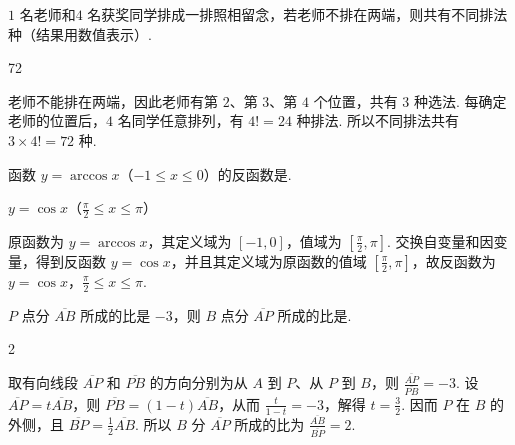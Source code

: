 \documentclass[UTF8,a4paper,oneside,11pt]{ctexbook}
\begin{document}
\begin{problem}
\(1\text{ 名}\)老师和\(4\text{ 名}\)获奖同学排成一排照相留念，若老师不排在两端，则共有不同排法\fillinblank{}\(\text{种}\)（结果用数值表示）.
\end{problem}

\begin{answer}
72
\end{answer}

\begin{solution}
老师不能排在两端，因此老师有第 \(2\)、第 \(3\)、第 \(4\) 个位置，共有 \(3\) 种选法. 每确定老师的位置后，\(4\) 名同学任意排列，有 \(4!=24\) 种排法. 所以不同排法共有 \(3\times 4!=72\) 种.
\end{solution}

\begin{problem}
函数 \(y = \arccos x\)（\(-1 \leqslant x \leqslant 0\)）的反函数是\fillinblank{}.
\end{problem}

\begin{answer}
\(y = \cos x\)（\(\frac{\pi}{2} \leqslant x \leqslant \pi\)）
\end{answer}

\begin{solution}
原函数为 \(y=\arccos x\)，其定义域为 \([-1,0]\)，值域为 \(\left[\frac{\pi}{2},\pi\right]\). 交换自变量和因变量，得到反函数 \(y=\cos x\)，并且其定义域为原函数的值域 \(\left[\frac{\pi}{2},\pi\right]\)，故反函数为 \(y=\cos x\)，\(\frac{\pi}{2}\leqslant x\leqslant\pi\).
\end{solution}

\begin{problem}
\(P\) 点分 \(\overline{AB}\) 所成的比是 \(-3\)，则 \(B\) 点分 \(\overline{AP}\) 所成的比是\fillinblank{}.
\end{problem}

\begin{answer}
2
\end{answer}

\begin{solution}
取有向线段 \(\overline{AP}\) 和 \(\overline{PB}\) 的方向分别为从 \(A\) 到 \(P\)、从 \(P\) 到 \(B\)，则
\(\frac{\overline{AP}}{\overline{PB}}=-3\). 设 \(\overline{AP}=t\overline{AB}\)，则 \(\overline{PB}=(1-t)\overline{AB}\)，从而 \(\frac{t}{1-t}=-3\)，解得 \(t=\frac{3}{2}\). 因而 \(P\) 在 \(B\) 的外侧，且 \(\overline{BP}=\frac{1}{2}\overline{AB}\). 所以 \(B\) 分 \(\overline{AP}\) 所成的比为 \(\frac{\overline{AB}}{\overline{BP}}=2\).
\end{solution}
\end{document}
